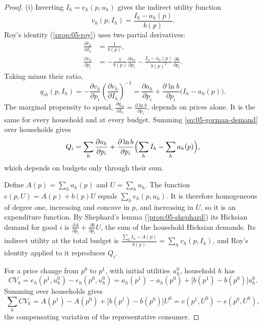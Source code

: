 \begin{proof}
(i) Inverting $I_h = e_h(p, u_h)$ gives the indirect utility function
\begin{equation*}
  v_h(p, I_h) = \frac{I_h - a_h(p)}{b(p)} .
\end{equation*}
Roy's identity (\cref{prop:05-roy}) uses two partial derivatives:
\begin{align*}
  \frac{\partial v_h}{\partial I_h} &= \frac{1}{b(p)}, \\
  \frac{\partial v_h}{\partial p_i} &= -\frac{1}{b(p)}\frac{\partial a_h}{\partial p_i}
     - \frac{I_h - a_h(p)}{b(p)^2}\frac{\partial b}{\partial p_i} .
\end{align*}
Taking minus their ratio,
\begin{equation}\label{eq:05-gorman-demand}
  q_{ih}(p, I_h) = -\frac{\partial v_h}{\partial p_i}\left(\frac{\partial v_h}{\partial I_h}\right)^{-1}
  = \frac{\partial a_h}{\partial p_i} + \frac{\partial \ln b}{\partial p_i}\bigl(I_h - a_h(p)\bigr).
\end{equation}
The marginal propensity to spend, $\frac{\partial q_{ih}}{\partial I_h} = \frac{\partial \ln b}{\partial
p_i}$, depends on prices alone. It is the same for every household and at every budget. Summing
\eqref{eq:05-gorman-demand} over households gives
\begin{equation*}
  Q_i = \sum_h \frac{\partial a_h}{\partial p_i}
      + \frac{\partial \ln b}{\partial p_i}\Bigl(\sum_h I_h - \sum_h a_h(p)\Bigr),
\end{equation*}
which depends on budgets only through their sum.

Define $A(p) = \sum_h a_h(p)$ and $U = \sum_h u_h$. The function $e(p, U) = A(p) + b(p)U$ equals
$\sum_h e_h(p, u_h)$. It is therefore homogeneous of degree one, increasing and concave in $p$, and
increasing in $U$, so it is an expenditure function.
By Shephard's lemma (\cref{prop:05-shephard}) its Hicksian demand for good $i$ is $\frac{\partial
A}{\partial p_i} + \frac{\partial b}{\partial p_i}U$, the sum of the household Hicksian demands. Its
indirect utility at the total budget is $\frac{\sum_h I_h - A(p)}{b(p)} = \sum_h v_h(p, I_h)$, and Roy's
identity applied to it reproduces $Q_i$.

For a price change from $p^0$ to $p^1$, with initial utilities $u_h^0$, household $h$ has
\begin{equation*}
  CV_h = e_h(p^1, u_h^0) - e_h(p^0, u_h^0) = a_h(p^1) - a_h(p^0) + \bigl[b(p^1) - b(p^0)\bigr] u_h^0 .
\end{equation*}
Summing over households gives
\begin{equation*}
  \sum_h CV_h = A(p^1) - A(p^0) + \bigl[b(p^1) - b(p^0)\bigr] U^0 = e(p^1, U^0) - e(p^0, U^0),
\end{equation*}
the compensating variation of the representative consumer.


\end{proof}
